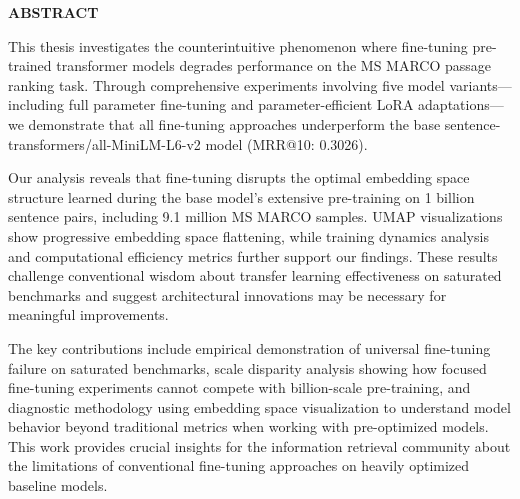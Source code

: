 \begin{center}
    {\large\bfseries ABSTRACT}
\end{center}
\begin{spacing}{1.5}
This thesis investigates the counterintuitive phenomenon where fine-tuning pre-trained transformer models degrades performance on the MS MARCO passage ranking task. Through comprehensive experiments involving five model variants—including full parameter fine-tuning and parameter-efficient LoRA adaptations—we demonstrate that all fine-tuning approaches underperform the base sentence-transformers/all-MiniLM-L6-v2 model (MRR@10: 0.3026). 

Our analysis reveals that fine-tuning disrupts the optimal embedding space structure learned during the base model's extensive pre-training on 1 billion sentence pairs, including 9.1 million MS MARCO samples. UMAP visualizations show progressive embedding space flattening, while training dynamics analysis and computational efficiency metrics further support our findings. These results challenge conventional wisdom about transfer learning effectiveness on saturated benchmarks and suggest architectural innovations may be necessary for meaningful improvements.

The key contributions include empirical demonstration of universal fine-tuning failure on saturated benchmarks, scale disparity analysis showing how focused fine-tuning experiments cannot compete with billion-scale pre-training, and diagnostic methodology using embedding space visualization to understand model behavior beyond traditional metrics when working with pre-optimized models. This work provides crucial insights for the information retrieval community about the limitations of conventional fine-tuning approaches on heavily optimized baseline models.
\end{spacing}

\newpage

\tableofcontents %
\listoffigures
\listoftables

